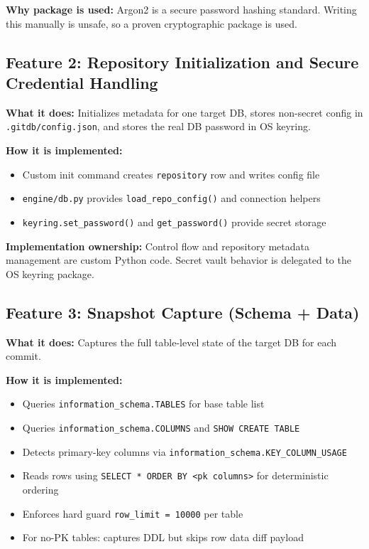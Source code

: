 \documentclass[12pt, a4paper]{article}
\begin{document}
\textbf{Why package is used:}
Argon2 is a secure password hashing standard. Writing this manually is unsafe,
so a proven cryptographic package is used.

\subsection{Feature 2: Repository Initialization and Secure Credential Handling}

\textbf{What it does:}
Initializes metadata for one target DB, stores non-secret config in
\texttt{.gitdb/config.json}, and stores the real DB password in OS keyring.

\textbf{How it is implemented:}
\begin{itemize}[leftmargin=1.5em]
    \item Custom init command creates \texttt{repository} row and writes config file
    \item \texttt{engine/db.py} provides \texttt{load\_repo\_config()} and connection helpers
    \item \texttt{keyring.set\_password()} and \texttt{get\_password()} provide secret storage
\end{itemize}

\textbf{Implementation ownership:}
Control flow and repository metadata management are custom Python code. Secret vault
behavior is delegated to the OS keyring package.

\subsection{Feature 3: Snapshot Capture (Schema + Data)}

\textbf{What it does:}
Captures the full table-level state of the target DB for each commit.

\textbf{How it is implemented:}
\begin{itemize}[leftmargin=1.5em]
    \item Queries \texttt{information\_schema.TABLES} for base table list
    \item Queries \texttt{information\_schema.COLUMNS} and \texttt{SHOW CREATE TABLE}
    \item Detects primary-key columns via \texttt{information\_schema.KEY\_COLUMN\_USAGE}
    \item Reads rows using \texttt{SELECT * ORDER BY <pk columns>} for deterministic ordering
    \item Enforces hard guard \texttt{row\_limit = 10000} per table
    \item For no-PK tables: captures DDL but skips row data diff payload
\end{itemize}
\end{document}
